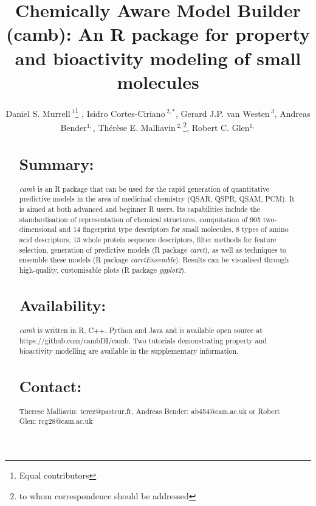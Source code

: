 \documentclass{bioinfo}
\begin{document}

\title{Chemically Aware Model Builder (camb): An R package for property and bioactivity modeling of small molecules}
\author[Murrell \& Cortes-Ciriano \it{et~al}]{Daniel S. Murrell\,$^{1}$\footnote{Equal contributors} , Isidro Cortes-Ciriano\,$^{2,*}$, Gerard J.P. van Westen\,$^{3}$, Andreas Bender$^{1,}$\dag, Th\'er\`ese E. Malliavin\,$^{2,}$\footnote{to whom correspondence should be addressed},  Robert C. Glen$^{1,}$\dag}
\address{$^{1}$Unilever Centre for Molecular Science Informatics, Department of Chemistry, University of Cambridge, Lensfield Road, Cambridge CB2 1EW, United Kingdom.\\
$^{2}$Unite de Bioinformatique Structurale, Institut Pasteur and CNRS UMR 3825, Structural Biology and Chemistry Department, 25, rue Dr. Roux, 75 724 Paris, France.\\
$^{3}$European Molecular Biology Laboratory European Bioinformatics Institute Wellcome Trust Genome Campus, Hinxton, United Kingdom.}

\maketitle

\begin{abstract}
\section{Summary:}
{\it camb} is an R package that can be used for the rapid generation of quantitative predictive models in the area of medicinal chemistry (QSAR, QSPR, QSAM, PCM). It is aimed at both advanced and beginner R users.
Its capabilities include the standardisation of representation of chemical structures, computation of 905 two-dimensional and 14 fingerprint type descriptors for small molecules, 8 types of amino acid descriptors, 13 whole protein sequence descriptors, filter methods for feature selection, generation of predictive models (R package {\it caret}), as well as techniques to ensemble these models (R package {\it caretEnsemble}).
Results can be visualised through high-quality, customisable plots (R package {\it ggplot2}).
\section{Availability:} {\it camb} is written in R, C++, Python and Java and is available open source
at https://github.com/cambDI/camb.
Two tutorials demonstrating property and bioactivity modelling are available in the supplementary information.\\
\section{Contact:} Therese Malliavin: terez@pasteur.fr, Andreas Bender: ab454@cam.ac.uk or Robert Glen: rcg28@cam.ac.uk
\end{abstract}
\end{document}
